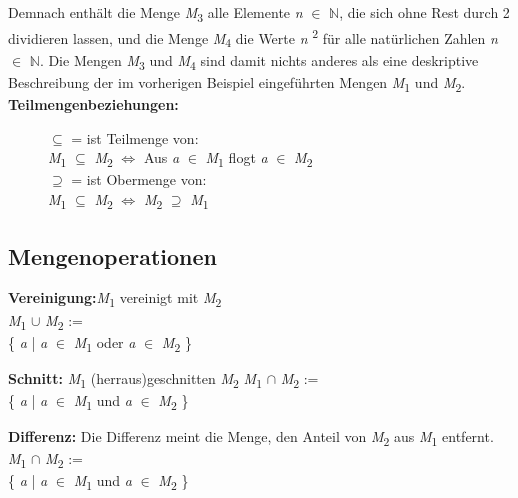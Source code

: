 Demnach enthält die Menge \textit{M}\textsubscript{3} alle Elemente \textit{n} $\in$ $\mathbb{N}$, die sich ohne
Rest durch 2 dividieren lassen, und die Menge \textit{M}\textsubscript{4} die Werte \textit{n} \textsuperscript{2} für alle natürlichen Zahlen \textit{n} $\in$ $\mathbb{N}$. Die Mengen \textit{M}\textsubscript{3} und \textit{M}\textsubscript{4} sind damit nichts anderes als eine deskriptive Beschreibung der im vorherigen
Beispiel eingeführten Mengen \textit{M}\textsubscript{1} und \textit{M}\textsubscript{2}.\\

\textbf{Teilmengenbeziehungen:}
\begin{figure}[H]
\centering

$\subseteq$ = ist Teilmenge von:\\ 
\textit{M}\textsubscript{1} $\subseteq$ \textit{M}\textsubscript{2} 
$\Leftrightarrow$ 
Aus \textit{a} $\in$ \textit{M}\textsubscript{1} flogt \textit{a} $\in$ \textit{M}\textsubscript{2}\\


$\supseteq$ = ist Obermenge von:\\
\textit{M}\textsubscript{1} $\subseteq$ \textit{M}\textsubscript{2}
$\Leftrightarrow$ 
\textit{M}\textsubscript{2} $\supseteq$ \textit{M}\textsubscript{1}\\

\end{figure}


\subsection{Mengenoperationen}


\textbf{Vereinigung:}\textit{M}\textsubscript{1} vereinigt mit \textit{M}\textsubscript{2}\\
\textit{M}\textsubscript{1} $\cup$ \textit{M}\textsubscript{2} :=  \\
\{ \textit{a} | \textit{a} $\in$ \textit{M}\textsubscript{1} oder \textit{a} $\in$ \textit{M}\textsubscript{2} \}


\textbf{Schnitt:} \textit{M}\textsubscript{1} (herraus)geschnitten \textit{M}\textsubscript{2} 
\textit{M}\textsubscript{1} $\cap$ \textit{M}\textsubscript{2} :=  \\
\{ \textit{a} | \textit{a} $\in$ \textit{M}\textsubscript{1} und \textit{a} $\in$ \textit{M}\textsubscript{2} \}


\textbf{Differenz:} Die Differenz meint die Menge, den Anteil von \textit{M}\textsubscript{2} aus \textit{M}\textsubscript{1} entfernt.
\textit{M}\textsubscript{1} $\cap$ \textit{M}\textsubscript{2} :=  \\
\{ \textit{a} | \textit{a} $\in$ \textit{M}\textsubscript{1} und \textit{a} $\in$ \textit{M}\textsubscript{2} \}


